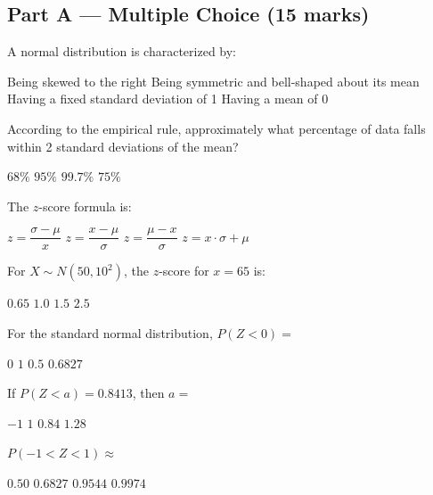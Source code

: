 \documentclass[addpoints]{exam}
\begin{document}
\newpage
\begin{questions}

\section*{Part A --- Multiple Choice (15 marks)}
\vspace{5mm}

\question[1] A normal distribution is characterized by:
\begin{choices}
    \choice Being skewed to the right
    \correctchoice Being symmetric and bell-shaped about its mean
    \choice Having a fixed standard deviation of 1
    \choice Having a mean of 0
\end{choices}

\question[1] According to the empirical rule, approximately what percentage of data falls
within 2 standard deviations of the mean?
\begin{choices}
    \choice $68\%$
    \correctchoice $95\%$
    \choice $99.7\%$
    \choice $75\%$
\end{choices}

\question[1] The $z$-score formula is:
\begin{choices}
    \choice $z = \dfrac{\sigma - \mu}{x}$
    \correctchoice $z = \dfrac{x - \mu}{\sigma}$
    \choice $z = \dfrac{\mu - x}{\sigma}$
    \choice $z = x \cdot \sigma + \mu$
\end{choices}

\question[1] For $X \sim N(50, 10^2)$, the $z$-score for $x = 65$ is:
\begin{choices}
    \choice $0.65$
    \choice $1.0$
    \correctchoice $1.5$
    \choice $2.5$
\end{choices}

\question[1] For the standard normal distribution, $P(Z < 0) =$
\begin{choices}
    \choice $0$
    \choice $1$
    \correctchoice $0.5$
    \choice $0.6827$
\end{choices}

\question[1] If $P(Z < a) = 0.8413$, then $a =$
\begin{choices}
    \choice $-1$
    \correctchoice $1$
    \choice $0.84$
    \choice $1.28$
\end{choices}

\question[1] $P(-1 < Z < 1) \approx$
\begin{choices}
    \choice $0.50$
    \correctchoice $0.6827$
    \choice $0.9544$
    \choice $0.9974$
\end{choices}


\end{questions}
\end{document}
